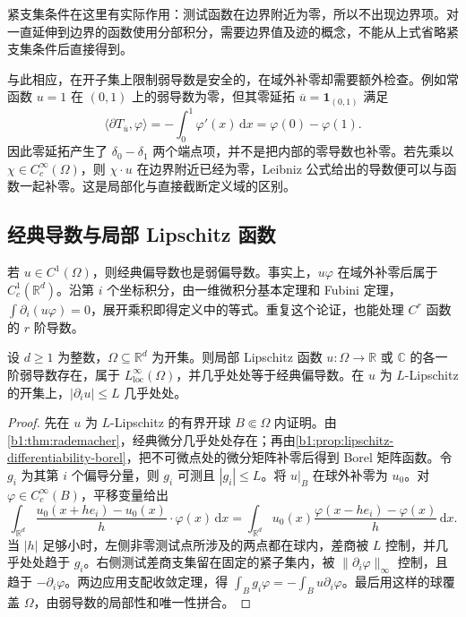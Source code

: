 \ProseParagraphBreak

紧支集条件在这里有实际作用：测试函数在边界附近为零，所以不出现边界项。对一直延伸到边界的函数使用分部积分，需要边界值及迹的概念，不能从上式省略紧支集条件后直接得到。

\ProseParagraphBreak

与此相应，在开子集上限制弱导数是安全的，在域外补零却需要额外检查。例如常函数 \(u=1\) 在 \((0,1)\) 上的弱导数为零，但其零延拓 \(\overline u=\mathbf1_{(0,1)}\) 满足
\[
 \langle\partial T_{\overline u},\varphi\rangle
 =-\int_0^1\varphi'(x)\,\mathrm dx
 =\varphi(0)-\varphi(1).
\]
因此零延拓产生了 \(\delta_0-\delta_1\) 两个端点项，并不是把内部的零导数也补零。若先乘以 \(\chi\in C_c^\infty(\Omega)\)，则 \(\chi\cdot u\) 在边界附近已经为零，Leibniz 公式给出的导数便可以与函数一起补零。这是局部化与直接截断定义域的区别。

\subsection{经典导数与局部 Lipschitz 函数}
\label{b1:subsec:200404}

若 \(u\in C^1(\Omega)\)，则经典偏导数也是弱偏导数。事实上，\(u\varphi\) 在域外补零后属于 \(C_c^1(\mathbb R^d)\)。沿第 \(i\) 个坐标积分，由一维微积分基本定理和 Fubini 定理，\(\int\partial_i(u\varphi)=0\)，展开乘积即得定义中的等式。重复这个论证，也能处理 \(C^r\) 函数的 \(r\) 阶导数。

\begin{theorem}
\label{b1:thm:lipschitz-weak-derivative}
设 \(d\geq1\) 为整数，\(\Omega\subseteq\mathbb R^d\) 为开集。则局部 Lipschitz 函数 \(u:\Omega\rightarrow\mathbb R\) 或 \(\mathbb C\) 的各一阶弱导数存在，属于 \(L^\infty_{\mathrm{loc}}(\Omega)\)，并几乎处处等于经典偏导数。在 \(u\) 为 \(L\)-Lipschitz 的开集上，\(|\partial_i u|\leq L\) 几乎处处。
\end{theorem}
\begin{proof}
先在 \(u\) 为 \(L\)-Lipschitz 的有界开球 \(B\Subset\Omega\) 内证明。由\cref{b1:thm:rademacher}，经典微分几乎处处存在；再由\cref{b1:prop:lipschitz-differentiability-borel}，把不可微点处的微分矩阵补零后得到 Borel 矩阵函数。令 \(g_i\) 为其第 \(i\) 个偏导分量，则 \(g_i\) 可测且 \(|g_i|\leq L\)。将 \(u|_B\) 在球外补零为 \(u_0\)。对 \(\varphi\in C_c^\infty(B)\)，平移变量给出
\[
 \int_{\mathbb R^d}\dfrac{u_0(x+he_i)-u_0(x)}h\cdot \varphi(x)\,\mathrm dx
 =\int_{\mathbb R^d}u_0(x)
   \dfrac{\varphi(x-he_i)-\varphi(x)}h\,\mathrm dx.
\]
当 \(|h|\) 足够小时，左侧非零测试点所涉及的两点都在球内，差商被 \(L\) 控制，并几乎处处趋于 \(g_i\)。右侧测试差商支集留在固定的紧子集内，被 \(\|\partial_i\varphi\|_\infty\) 控制，且趋于 \(-\partial_i\varphi\)。两边应用支配收敛定理，得 \(\int_Bg_i\varphi=-\int_Bu\partial_i\varphi\)。最后用这样的球覆盖 \(\Omega\)，由弱导数的局部性和唯一性拼合。
\end{proof}

